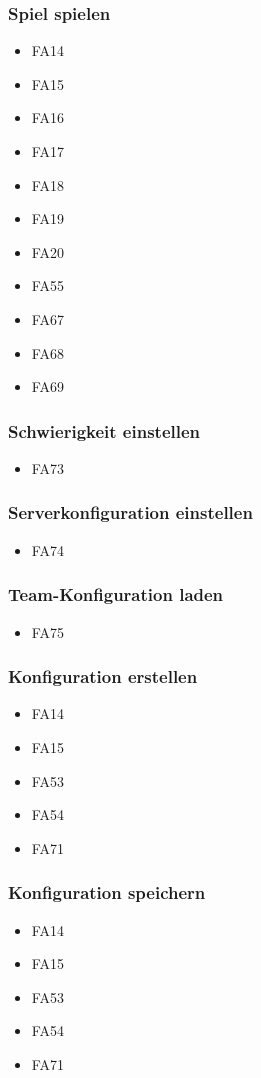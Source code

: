 \subsubsection{Spiel spielen}
\begin{itemize} 
	\item FA14 
	\item FA15 
	\item FA16 
	\item FA17 
	\item FA18 
	\item FA19 
	\item FA20 
	\item FA55 
	\item FA67
	\item FA68 
	\item FA69 
\end{itemize}
\subsubsection{Schwierigkeit einstellen}
\begin{itemize} 
	\item FA73 
\end{itemize}
\subsubsection{Serverkonfiguration einstellen}
\begin{itemize} 
	\item FA74 
\end{itemize}
\subsubsection{Team-Konfiguration laden}
\begin{itemize} 
	\item FA75 
\end{itemize}
\subsubsection{Konfiguration erstellen}
\begin{itemize} 
	\item FA14
	\item FA15 
	\item FA53 
	\item FA54 
	\item FA71 
\end{itemize}
\subsubsection{Konfiguration speichern}
\begin{itemize} 
	\item FA14
	\item FA15 
	\item FA53 
	\item FA54 
	\item FA71 
\end{itemize}
